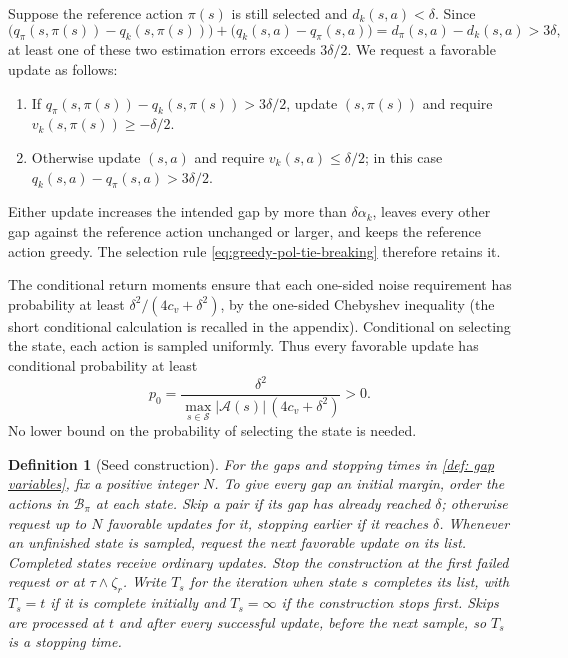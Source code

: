 \documentclass[twoside,11pt]{article}
\newtheorem{definition}[definition]{Definition}
\DeclareRobustCommand{\reviewbarstart}{%
  \ifhmode %
    \vadjust{\vbox to 0pt{%
      \vskip-\ht\strutbox %
      \vskip-\dp\strutbox %
      \cbstart[\changebarwidth] %
      \vss %
    }}%
  \else %
    \cbstart[\changebarwidth]%
  \fi %
} %
\providecommand{\DIFadd}[1]{#1} %
\providecommand{\DIFaddbegin}{\reviewbarstart} %
\providecommand{\DIFaddend}{\protect\cbend} %
\def\DIFadd#1{#1}%
\def\DIFaddbegin{}%
\def\DIFaddend{}%
\begin{document}
 \DIFaddbegin \DIFadd{Suppose the reference action $\pi(s)$ is still selected and $d_k(s,a)<\delta$. Since
}\[
\DIFadd{\big(q_\pi(s,\pi(s))-q_k(s,\pi(s))\big)
+\big(q_k(s,a)-q_\pi(s,a)\big)
=d_\pi(s,a)-d_k(s,a)>3\delta,
}\]
\DIFadd{at least one of these two estimation errors exceeds $3\delta/2$. We request a favorable update as follows:
}\begin{enumerate}
\item \DIFadd{If $q_\pi(s,\pi(s))-q_k(s,\pi(s))>3\delta/2$, update $(s,\pi(s))$ and require $v_k(s,\pi(s))\ge-\delta/2$.
}\item \DIFadd{Otherwise update $(s,a)$ and require $v_k(s,a)\le\delta/2$; in this case $q_k(s,a)-q_\pi(s,a)>3\delta/2$.
}\end{enumerate}
\DIFadd{Either update increases the intended gap by more than $\delta\alpha_k$, leaves every other gap against the reference action unchanged or larger, and keeps the reference action greedy. The selection rule \eqref{eq:greedy-pol-tie-breaking} therefore retains it.
}\DIFaddend 

 \DIFaddbegin \DIFadd{The conditional return moments ensure that each one-sided noise requirement has probability at least $\delta^2/(4c_v+\delta^2)$, by the one-sided Chebyshev inequality (the short conditional calculation is recalled in the appendix). Conditional on selecting the state, each action is sampled uniformly. Thus every favorable update has conditional probability at least
}\begin{equation}
\DIFadd{\label{eq:localprob}
p_0=\frac{\delta^2}{\max_{s\in\mathcal S}|\mathcal A(s)|\,(4c_v+\delta^2)}>0.
}\end{equation}\DIFaddend 
 \DIFaddbegin \DIFadd{No lower bound on the probability of selecting the state is needed.
}\DIFaddend 

\DIFaddbegin \begin{definition}[Seed construction]
\label{def: seed construction}
\DIFadd{For the gaps and stopping times in \autoref{def: gap variables}, fix a positive integer $N$. To give every gap an initial margin, order the actions in $\mathcal B_\pi$ at each state. Skip a pair if its gap has already reached $\delta$; otherwise request up to $N$ favorable updates for it, stopping earlier if it reaches $\delta$. Whenever an unfinished state is sampled, request the next favorable update on its list. Completed states receive ordinary updates. Stop the construction at the first failed request or at $\tau\wedge\zeta_r$.
Write $T_s$ for the iteration when state $s$ completes its list, with $T_s=t$ if it is complete initially and $T_s=\infty$ if the construction stops first. Skips are processed at $t$ and after every successful update, before the next sample, so $T_s$ is a stopping time.
}\end{definition}
\DIFaddend 
\end{document}
